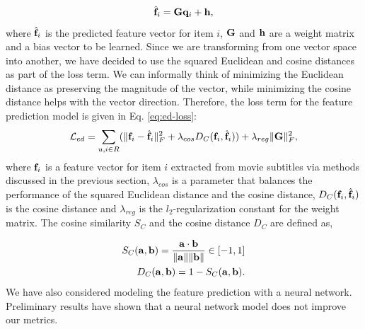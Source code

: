 \begin{equation}
\hat{\mathbf{f}}_{i} = \mathbf{G} \mathbf{q}_i + \mathbf{h} \label{eq:affine-transformation},
\end{equation}
where $\hat{\mathbf{f}}_i$ is the predicted feature vector for item $i$, $\mathbf{G}$ and $\mathbf{h}$ are a weight matrix and a bias vector to be learned.
Since we are transforming from one vector space into another, we have decided to use the squared Euclidean and cosine distances as part of the loss term.
We can informally think of minimizing the Euclidean distance as preserving the magnitude of the vector, while minimizing the cosine distance helps with the vector direction. 
Therefore, the loss term for the feature prediction model is given in Eq. \ref{eq:ed-loss}:
\begin{equation}
\mathcal{L}_{ed} = \sum_{u,i \in R} (\lVert{\ensuremath{\mathbf{f}}_i - \hat{\ensuremath{\mathbf{f}}}_i}\rVert_F^2 + \lambda_{cos} D_C(\mathbf{f}_i, \hat{\mathbf{f}}_i)) + \lambda_{reg} \lVert{\ensuremath{\mathbf{G}}}\rVert_F^2  \label{eq:ed-loss},
\end{equation}
where $\mathbf{f}_i$ is a feature vector for item $i$ extracted from movie subtitles via methods discussed in the previous section, $\lambda_{cos}$ is a parameter that balances the performance of the squared Euclidean distance and the cosine distance, $D_C(\mathbf{f}_i, \hat{\mathbf{f}}_i)$ is the cosine distance and $\lambda_{reg}$ is the $l_2$-regularization constant for the weight matrix.
The cosine similarity $S_C$ and the cosine distance $D_C$ are defined as,

\begin{align}
	S_C(\mathbf{a}, \mathbf{b}) = \frac{\mathbf{a} \cdot \mathbf{b}}{\lVert{\ensuremath{\mathbf{a}}}\rVert \lVert{\ensuremath{\mathbf{b}}}\rVert} \in [-1, 1] \label{eq:cosine-sim}\\
	D_C(\mathbf{a}, \mathbf{b}) = 1 - S_C(\mathbf{a}, \mathbf{b}).
\end{align}
We have also considered modeling the feature prediction with a neural network.
Preliminary results have shown that a neural network model does not improve our metrics.


